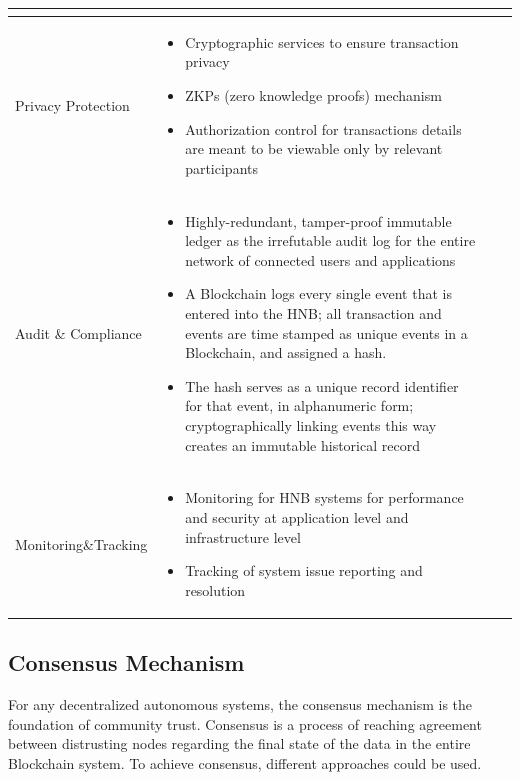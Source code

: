 \documentclass[fleqn,10pt]{SelfArx} %
\begin{document}
\begin{table}[!ht]
\begin{tabular}{lp{12cm}p{50cm}r}
\begin{itemize}
\end{itemize}
\\
\midrule
Privacy Protection
 & 
\begin{itemize}
\item{Cryptographic services to ensure transaction privacy}
\item{ZKPs (zero knowledge proofs) mechanism }
\item{Authorization control for transactions details are meant to be viewable only by relevant participants}
\end{itemize}
\\
\midrule
Audit \& Compliance
 & 
\begin{itemize}
\item{Highly-redundant, tamper-proof immutable ledger as the irrefutable audit log for the entire network of connected users and applications}
\item{A Blockchain logs every single event that is entered into the HNB; all transaction and events are time stamped as unique events in a Blockchain, and assigned a hash.}
\item{The hash serves as a unique record identifier for that event, in alphanumeric form; cryptographically linking events this way creates an immutable historical record}
\end{itemize}\\
\midrule
Monitoring\&Tracking
 & 
\begin{itemize}
\item{Monitoring for HNB systems for performance and security at application level and infrastructure level}
\item{Tracking of system issue reporting and resolution}
\end{itemize}\\
\bottomrule
\end{tabular}
\label{tab:label}
\end{table}


\subsection{Consensus Mechanism}

For any decentralized autonomous systems, the consensus mechanism is the foundation of community trust. Consensus is a process of reaching agreement between distrusting nodes regarding the final state of the data in the entire Blockchain system. To achieve consensus, different approaches could be used.
\end{document}
